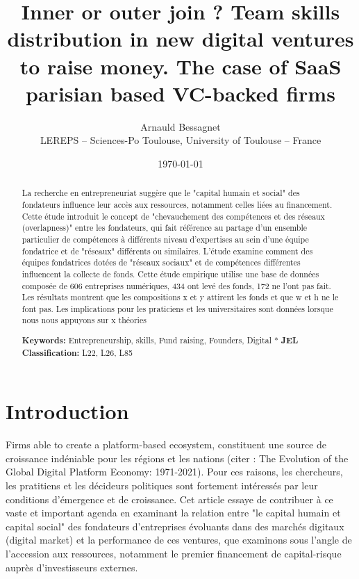 \documentclass[11pt]{article}
\begin{document}
\title{Inner or outer join ? Team skills distribution in new digital ventures to raise money. The case of SaaS parisian based VC-backed firms}

\author{Arnauld Bessagnet \\ \footnotesize{LEREPS – Sciences-Po Toulouse, University of Toulouse – France} \\}

\date{\today}
\maketitle

\begin{abstract}
\noindent
La recherche en entrepreneuriat suggère que le "capital humain et social" des fondateurs influence leur accès aux ressources, notamment celles liées au financement. Cette étude introduit le concept de "chevauchement des compétences et des réseaux (overlapness)" entre les fondateurs, qui fait référence au partage d'un ensemble particulier de compétences à différents niveau d'expertises au sein d'une équipe fondatrice et de "réseaux" différents ou similaires. L'étude examine comment des équipes fondatrices dotées de "réseaux sociaux" et de compétences différentes influencent la collecte de fonds. Cette étude empirique utilise une base de données composée de 606 entreprises numériques, 434 ont levé des fonds, 172 ne l'ont pas fait. Les résultats montrent que les compositions x et y attirent les fonds et que w et h ne le font pas. Les implications pour les praticiens et les universitaires sont données lorsque nous nous appuyons sur x théories\newline

\noindent \textbf{Keywords:} Entrepreneurship, skills, Fund raising, Founders, Digital \newline
*
\noindent \textbf{JEL Classification:} L22, L26, L85

\end{abstract}

\clearpage
\section{Introduction}

Firms able to create a platform-based ecosystem, constituent une source de croissance indéniable pour les régions et les nations (citer : The Evolution of the Global Digital Platform Economy: 1971-2021). Pour ces raisons, les chercheurs, les pratitiens et les décideurs politiques sont fortement intéressés par leur conditions d'émergence et de croissance. Cet article essaye de contribuer à ce vaste et important agenda en examinant la relation entre "le capital humain et capital social" des fondateurs d'entreprises évoluants dans des marchés digitaux (digital market) et la performance de ces ventures, que examinons sous l'angle de l'accession aux ressources, notamment le premier financement de capital-risque auprès d'investisseurs externes.
\end{document}
